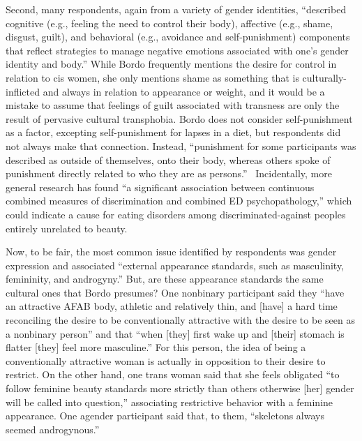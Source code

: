 \documentclass[11pt]{article}
\begin{document}
    Second, many respondents, again from a variety of gender identities, ``described cognitive (e.g., feeling the need to control their body), affective (e.g., shame, disgust,
    guilt), and behavioral (e.g., avoidance and self-punishment) components that reflect strategies to manage negative emotions associated with one's gender identity and body.'' While Bordo frequently mentions the desire for control in relation to cis women, she only mentions shame as something that is culturally-inflicted and always in relation to appearance or weight, and it would be a mistake to assume that feelings of guilt associated with transness are only the result of pervasive cultural transphobia. Bordo does not consider self-punishment as a factor, excepting self-punishment for lapses in a diet, but respondents did not always make that connection. Instead, ``punishment for some participants was described as outside of themselves, onto their body, whereas others spoke of punishment directly related to who they are as persons.''~\autocite[427. It would be deeply misguided to view this as the same sort of shame that Bordo suggests all women are taught to feel for their femininity. Not only is that cultural shame not comparable to the societal disgust often shown towards trans people, sometimes people, without external indoctrination, might just not like themselves very much.]{Cusak22} Incidentally, more general research has found ``a significant association between continuous combined measures of discrimination and combined ED psychopathology,'' which could indicate a cause for eating disorders among discriminated-against peoples entirely unrelated to beauty.~\autocite[410]{Mason21}

    Now, to be fair, the most common issue identified by respondents was gender expression and associated ``external appearance standards, such as masculinity, femininity, and androgyny.'' But, are these appearance standards the same cultural ones that Bordo presumes? One nonbinary participant said they ``have an attractive AFAB body, athletic and relatively thin, and [have] a hard time reconciling the desire to be conventionally attractive with the desire to be seen as a nonbinary person'' and that ``when [they] first wake up and [their] stomach is flatter [they] feel more masculine.'' For this person, the idea of being a conventionally attractive woman is actually in opposition to their desire to restrict. On the other hand, one trans woman said that she feels obligated ``to follow feminine beauty standards more strictly than others otherwise [her] gender will be called into question,'' associating restrictive behavior with a feminine appearance. One agender participant said that, to them, ``skeletons always seemed androgynous.'' \autocite[427-428]{Cusak22}
\end{document}
